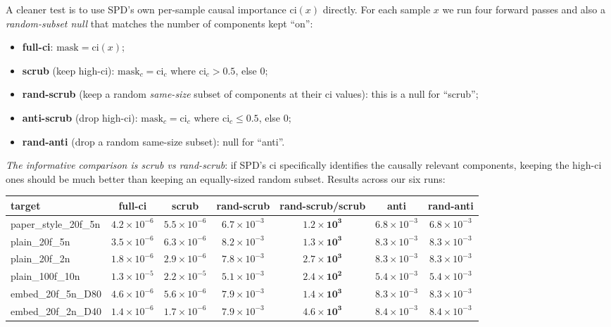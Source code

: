 \documentclass[11pt]{article}
\begin{document}
A cleaner test is to use SPD's own per-sample causal importance
$\mathrm{ci}(x)$ directly. For each sample $x$ we run four forward
passes and also a \emph{random-subset null} that matches the number of
components kept ``on'':
\begin{itemize}
\item \textbf{full-ci}: $\mathrm{mask} = \mathrm{ci}(x)$;
\item \textbf{scrub} (keep high-ci): $\mathrm{mask}_c = \mathrm{ci}_c$
  where $\mathrm{ci}_c > 0.5$, else $0$;
\item \textbf{rand-scrub} (keep a random \emph{same-size} subset of
  components at their ci values): this is a null for ``scrub'';
\item \textbf{anti-scrub} (drop high-ci): $\mathrm{mask}_c = \mathrm{ci}_c$
  where $\mathrm{ci}_c \le 0.5$, else $0$;
\item \textbf{rand-anti} (drop a random same-size subset): null for ``anti''.
\end{itemize}
\emph{The informative comparison is scrub vs rand-scrub}: if SPD's ci
specifically identifies the causally relevant components, keeping the
high-ci ones should be much better than keeping an equally-sized random
subset. Results across our six runs:

\begin{center}\small
\begin{tabular}{lcccccc}
\toprule
target & full-ci & scrub & rand-scrub & \textbf{rand-scrub/scrub} & anti & rand-anti \\
\midrule
paper\_style\_20f\_5n & $4.2\times 10^{-6}$ & $5.5\times 10^{-6}$ & $6.7\times 10^{-3}$ & $\mathbf{1.2\times 10^{3}}$ & $6.8\times 10^{-3}$ & $6.8\times 10^{-3}$ \\
plain\_20f\_5n        & $3.5\times 10^{-6}$ & $6.3\times 10^{-6}$ & $8.2\times 10^{-3}$ & $\mathbf{1.3\times 10^{3}}$ & $8.3\times 10^{-3}$ & $8.3\times 10^{-3}$ \\
plain\_20f\_2n        & $1.8\times 10^{-6}$ & $2.9\times 10^{-6}$ & $7.8\times 10^{-3}$ & $\mathbf{2.7\times 10^{3}}$ & $8.3\times 10^{-3}$ & $8.3\times 10^{-3}$ \\
plain\_100f\_10n      & $1.3\times 10^{-5}$ & $2.2\times 10^{-5}$ & $5.1\times 10^{-3}$ & $\mathbf{2.4\times 10^{2}}$ & $5.4\times 10^{-3}$ & $5.4\times 10^{-3}$ \\
embed\_20f\_5n\_D80   & $4.6\times 10^{-6}$ & $5.6\times 10^{-6}$ & $7.9\times 10^{-3}$ & $\mathbf{1.4\times 10^{3}}$ & $8.3\times 10^{-3}$ & $8.3\times 10^{-3}$ \\
embed\_20f\_2n\_D40   & $1.4\times 10^{-6}$ & $1.7\times 10^{-6}$ & $7.9\times 10^{-3}$ & $\mathbf{4.6\times 10^{3}}$ & $8.4\times 10^{-3}$ & $8.4\times 10^{-3}$ \\
\bottomrule
\end{tabular}
\end{center}
\end{document}
